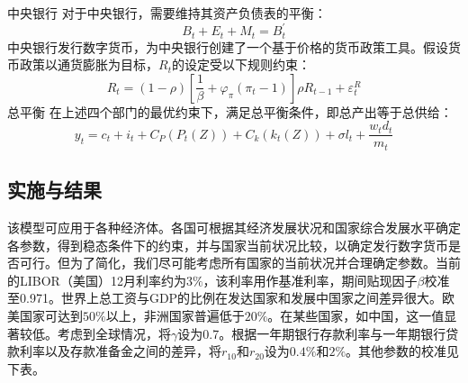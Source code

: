\documentclass[withoutpreface,bwprint]{cumcmthesis} %
\begin{document}
{\heiti 中央银行} 对于中央银行，需要维持其资产负债表的平衡：
\begin{equation}
	B_t+E_t+M_t=B_t^{\prime}
\end{equation}
中央银行发行数字货币，为中央银行创建了一个基于价格的货币政策工具。假设货币政策以通货膨胀为目标，$R_t$的设定受以下规则约束：
\begin{equation}
	R_t=(1-\rho)\left[\frac{1}{\beta}+\varphi_\pi\left(\pi_t-1\right)\right] \rho R_{t-1}+\varepsilon_t^R
\end{equation}
{\heiti 总平衡} 在上述四个部门的最优约束下，满足总平衡条件，即总产出等于总供给：
\begin{equation}
	y_t=c_t+i_t+C_P\left(P_t(Z)\right)+C_k\left(k_t(Z)\right)+\sigma l_t+\frac{w_t d_t}{m_t}
\end{equation}

\subsection{实施与结果}
该模型可应用于各种经济体。各国可根据其经济发展状况和国家综合发展水平确定各参数，得到稳态条件下的约束，并与国家当前状况比较，以确定发行数字货币是否可行。但为了简化，我们尽可能考虑所有国家的当前状况并合理确定参数。当前的LIBOR（美国）12月利率约为$3\%$，该利率用作基准利率，期间贴现因子$\beta$校准至0.971。世界上总工资与GDP的比例在发达国家和发展中国家之间差异很大。欧美国家可达到$50\%$以上，非洲国家普遍低于$20\%$。在某些国家，如中国，这一值显著较低。考虑到全球情况，将$\gamma$设为0.7。根据一年期银行存款利率与一年期银行贷款利率以及存款准备金之间的差异，将$r_10$和$r_20$设为$0.4\%$和$2\%$。其他参数的校准见下表。

\end{document}
